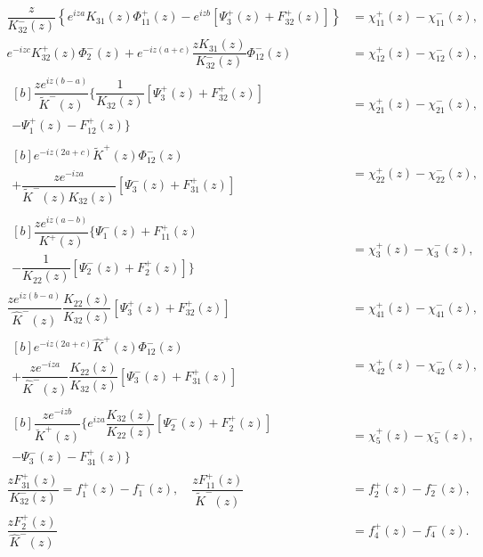 \begin{equation}\label{Ostryk_Eq_22_} 
\begin{aligned}
	\dfrac{z}{K_{32}^{-} (z)} \left\{e^{iza} K_{31} (z)\Phi _{11}^{+} (z)-e^{izb} \left[\Psi _{3}^{+} (z)+F_{32}^{+} (z)\right]\right\}&=\chi _{11}^{+} (z)-\chi _{11}^{-} (z),
	\\
	e^{-izc} K_{32}^{+} (z)\Phi _{2}^{-} (z)+e^{-iz(a+c)} \dfrac{zK_{31} (z)}{K_{32}^{-} (z)} \Phi _{12}^{-} (z)&=\chi _{12}^{+} (z)-\chi _{12}^{-} (z),
	\\
	\begin{multlined}[b]
		\dfrac{ze^{iz(b-a)} }{\tilde{K}^{-} (z)} \bigg\{\dfrac{1}{K_{32} (z)} \left[\Psi _{3}^{+} (z)+F_{32}^{+} (z)\right]
		\\
		-\Psi _{1}^{+} (z)-F_{12}^{+} (z)\bigg\}
	\end{multlined}&=\chi _{21}^{+} (z)-\chi _{21}^{-} (z),
	\\
	\begin{multlined}[b]
		e^{-iz(2a+c)} \tilde{K}^{+} (z)\Phi _{12}^{-} (z)
		\\
		+\dfrac{ze^{-iza} }{\tilde{K}^{-} (z)K_{32} (z)} \left[\Psi _{3}^{-} (z)+F_{31}^{+} (z)\right]
	\end{multlined}&=\chi _{22}^{+} (z)-\chi _{22}^{-} (z),
	\\
	\begin{multlined}[b]
		\dfrac{ze^{iz(a-b)} }{K^{+} (z)} \bigg\{\Psi _{1}^{-} (z)+F_{11}^{+} (z)
		\\
		-\dfrac{1}{K_{22} (z)} \left[\Psi _{2}^{-} (z)+F_{2}^{+} (z)\right]\bigg\}
	\end{multlined}&=\chi _{3}^{+} (z)-\chi _{3}^{-} (z),
	\\
	\dfrac{ze^{iz(b-a)} }{\hat{K}^{-} (z)} \dfrac{K_{22} (z)}{K_{32} (z)} \left[\Psi _{3}^{+} (z)+F_{32}^{+} (z)\right]&=\chi _{41}^{+} (z)-\chi _{41}^{-} (z),
	\\
	\begin{multlined}[b]
		e^{-iz(2a+c)} \hat{K}^{+} (z)\Phi _{12}^{-} (z)
		\\
		+\dfrac{ze^{-iza} }{\hat{K}^{-} (z)} \dfrac{K_{22} (z)}{K_{32} (z)} \left[\Psi _{3}^{-} (z)+F_{31}^{+} (z)\right]
	\end{multlined}&=\chi _{42}^{+} (z)-\chi _{42}^{-} (z),
	\\
	\begin{multlined}[b]
		\dfrac{ze^{-izb} }{\breve{K}^{+} (z)} \bigg\{e^{iza} \dfrac{K_{32} (z)}{K_{22} (z)} \left[\Psi _{2}^{-} (z)+F_{2}^{+} (z)\right]
		\\
		-\Psi _{3}^{-} (z)-F_{31}^{+} (z)\bigg\}\end{multlined}&=\chi _{5}^{+} (z)-\chi _{5}^{-} (z),
	\\
	\dfrac{zF_{31}^{+} (z)}{K_{32}^{-} (z)} = f_{1}^{+} (z)-f_{1}^{-} (z),
	\quad
	\dfrac{zF_{11}^{+} (z)}{\tilde{K}^{-} (z)} &= f_{2}^{+} (z)-f_{2}^{-} (z), 
	\\
	\dfrac{zF_{2}^{+} (z)}{\hat{K}^{-} (z)} &= f_{4}^{+} (z)-f_{4}^{-} (z).
\end{aligned}
\end{equation}


